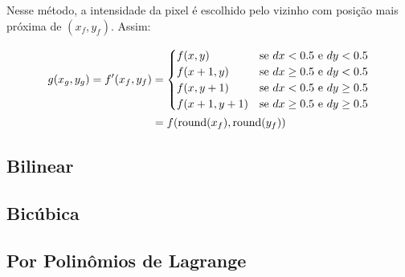 Nesse método, a intensidade da pixel é escolhido pelo vizinho com posição mais próxima de $(x_f, y_f)$. Assim: %

\begin{align*}
    g(x_g, y_g) = f'(x_f, y_f) &= \begin{cases}
        f(x, y) & \text{se } dx < 0.5 \text{ e } dy < 0.5 \\
        f(x+1, y) & \text{se } dx \geq 0.5 \text{ e } dy < 0.5 \\
        f(x, y+1) & \text{se } dx < 0.5 \text{ e } dy \geq 0.5 \\
        f(x+1, y+1) & \text{se } dx \geq 0.5 \text{ e } dy \geq 0.5 \\
    \end{cases} \\
    &= f(\operatorname{round}(x_f), \operatorname{round}(y_f))
\end{align*}

\subsection{Bilinear} \label{sec:interp:bilinear}

\subsection{Bicúbica} \label{sec:interp:bicubica}

\subsection{Por Polinômios de Lagrange} \label{sec:interp:lagrange}
